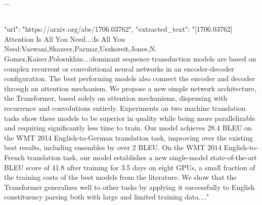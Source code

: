 \begin{textcolorbox}
...
\\\\
\begin{codebox}
{
    "url": "https://arxiv.org/abs/1706.03762",
    "extracted_text": "[1706.03762] Attention Is All You Need\n\n...\n{}\n\nTitle:\nAttention Is All You Need\n\nAuthors:\nAshish Vaswani\n,\nNoam Shazeer\n,\nNiki Parmar\n,\nJakob Uszkoreit\n,\nLlion Jones\n,\nAidan N. Gomez\n,\nLukasz Kaiser\n,\nIllia Polosukhin\n\n...\n\nAbstract:\nThe dominant sequence transduction models are based on complex recurrent or convolutional neural networks in an encoder-decoder configuration. The best performing models also connect the encoder and decoder through an attention mechanism. We propose a new simple network architecture, the Transformer, based solely on attention mechanisms, dispensing with recurrence and convolutions entirely. Experiments on two machine translation tasks show these models to be superior in quality while being more parallelizable and requiring significantly less time to train. Our model achieves 28.4 BLEU on the WMT 2014 English-to-German translation task, improving over the existing best results, including ensembles by over 2 BLEU. On the WMT 2014 English-to-French translation task, our model establishes a new single-model state-of-the-art BLEU score of 41.8 after training for 3.5 days on eight GPUs, a small fraction of the training costs of the best models from the literature. We show that the Transformer generalizes well to other tasks by applying it successfully to English constituency parsing both with large and limited training data.\n\n..."
}
\end{codebox}

\end{textcolorbox}
